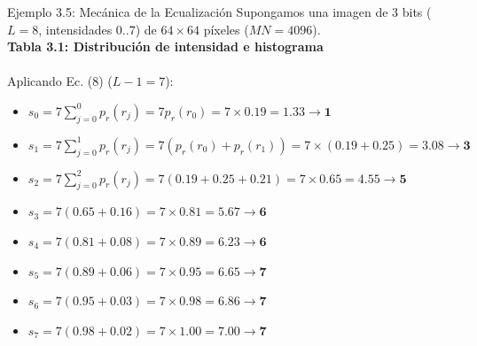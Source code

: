 \documentclass{beamer}
\begin{document}
\begin{frame}{Ejemplo 3.5: Mecánica de la Ecualización}\footnotesize
  Supongamos una imagen de 3 bits ($L=8$, intensidades $0..7$) de $64 \times 64$ píxeles ($MN=4096$).\\
  \textbf{Tabla 3.1: Distribución de intensidad e histograma}\tiny\\
  \centering
  \vspace{0.5em} %
  \pause\\
  \footnotesize{Aplicando Ec. (8) ($L-1=7$):}
  \begin{footnotesize} %
  \begin{itemize}
    \item $s_0 = 7 \sum_{j=0}^{0} p_r(r_j) = 7 p_r(r_0) = 7 \times 0.19 = 1.33 \rightarrow \mathbf{1}$
    \item $s_1 = 7 \sum_{j=0}^{1} p_r(r_j) = 7 (p_r(r_0) + p_r(r_1)) = 7 \times (0.19+0.25) = 3.08 \rightarrow \mathbf{3}$
    \item $s_2 = 7 \sum_{j=0}^{2} p_r(r_j) = 7 (0.19+0.25+0.21) = 7 \times 0.65 = 4.55 \rightarrow \mathbf{5}$
    \item $s_3 = 7 (0.65+0.16) = 7 \times 0.81 = 5.67 \rightarrow \mathbf{6}$
    \item $s_4 = 7 (0.81+0.08) = 7 \times 0.89 = 6.23 \rightarrow \mathbf{6}$
    \item $s_5 = 7 (0.89+0.06) = 7 \times 0.95 = 6.65 \rightarrow \mathbf{7}$
    \item $s_6 = 7 (0.95+0.03) = 7 \times 0.98 = 6.86 \rightarrow \mathbf{7}$
    \item $s_7 = 7 (0.98+0.02) = 7 \times 1.00 = 7.00 \rightarrow \mathbf{7}$
  \end{itemize}
  \end{footnotesize}
\end{frame}
\end{document}
